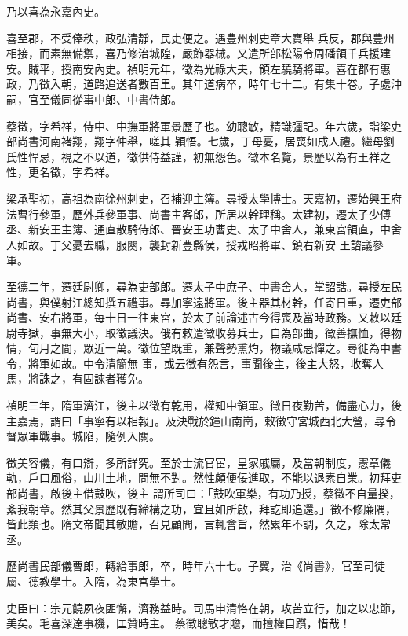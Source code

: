 \begin{pinyinscope}
 乃以喜為永嘉內史。



 喜至郡，不受俸秩，政弘清靜，民吏便之。遇豊州刺史章大寶舉
 兵反，郡與豊州相接，而素無備禦，喜乃修治城隍，嚴飾器械。又遣所部松陽令周磻領千兵援建安。賊平，授南安內史。禎明元年，徵為光祿大夫，領左驍騎將軍。喜在郡有惠政，乃徵入朝，道路追送者數百里。其年道病卒，時年七十二。有集十卷。子處沖嗣，官至儀同從事中郎、中書侍郎。



 蔡徵，字希祥，侍中、中撫軍將軍景歷子也。幼聰敏，精識彊記。年六歲，詣梁吏部尚書河南褚翔，翔字仲舉，嗟其
 穎悟。七歲，丁母憂，居喪如成人禮。繼母劉氏性悍忌，視之不以道，徵供侍益謹，初無怨色。徵本名覽，景歷以為有王祥之性，更名徵，字希祥。



 梁承聖初，高祖為南徐州刺史，召補迎主簿。尋授太學博士。天嘉初，遷始興王府法曹行參軍，歷外兵參軍事、尚書主客郎，所居以幹理稱。太建初，遷太子少傅丞、新安王主簿、通直散騎侍郎、晉安王功曹史、太子中舍人，兼東宮領直，中舍人如故。丁父憂去職，服闋，襲封新豊縣侯，授戎昭將軍、鎮右新安
 王諮議參軍。



 至德二年，遷廷尉卿，尋為吏部郎。遷太子中庶子、中書舍人，掌詔誥。尋授左民尚書，與僕射江總知撰五禮事。尋加寧遠將軍。後主器其材幹，任寄日重，遷吏部尚書、安右將軍，每十日一往東宮，於太子前論述古今得喪及當時政務。又敕以廷尉寺獄，事無大小，取徵議決。俄有敕遣徵收募兵士，自為部曲，徵善撫恤，得物情，旬月之間，眾近一萬。徵位望既重，兼聲勢熏灼，物議咸忌憚之。尋徙為中書令，將軍如故。中令清簡無
 事，或云徵有怨言，事聞後主，後主大怒，收奪人馬，將誅之，有固諫者獲免。



 禎明三年，隋軍濟江，後主以徵有乾用，權知中領軍。徵日夜勤苦，備盡心力，後主嘉焉，謂曰「事寧有以相報」。及決戰於鐘山南崗，敕徵守宮城西北大營，尋令督眾軍戰事。城陷，隨例入關。



 徵美容儀，有口辯，多所詳究。至於士流官宦，皇家戚屬，及當朝制度，憲章儀軌，戶口風俗，山川土地，問無不對。然性頗便佞進取，不能以退素自業。初拜吏部尚書，啟後主借鼓吹，後主
 謂所司曰：「鼓吹軍樂，有功乃授，蔡徵不自量揆，紊我朝章。然其父景歷既有締構之功，宜且如所啟，拜訖即追還。」徵不修廉隅，皆此類也。隋文帝聞其敏贍，召見顧問，言輒會旨，然累年不調，久之，除太常丞。



 歷尚書民部儀曹郎，轉給事郎，卒，時年六十七。子翼，治《尚書》，官至司徒屬、德教學士。入隋，為東宮學士。



 史臣曰：宗元饒夙夜匪懈，濟務益時。司馬申清恪在朝，攻苦立行，加之以忠節，美矣。毛喜深達事機，匡贊時主。
 蔡徵聰敏才贍，而擅權自躓，惜哉！



\end{pinyinscope}